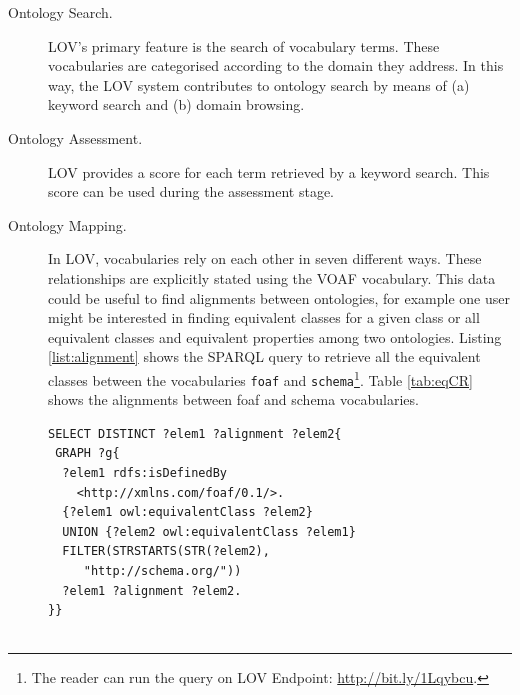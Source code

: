 \documentclass{iosart2c}
\begin{document}
\begin{description}

 \item [Ontology Search.] LOV's primary feature is the search of vocabulary terms. These vocabularies are categorised according to the domain they address. In this way, the LOV system contributes to ontology search by means of (a) keyword search and (b) domain browsing.
 \item [Ontology Assessment.] LOV provides a score for each term retrieved by a keyword search. This score can be used during the assessment stage.
 \item [Ontology Mapping.] In LOV, vocabularies rely on each other in seven different ways. These relationships are explicitly stated using the VOAF vocabulary. This data could be useful to find alignments between ontologies, for example one user might be interested in finding equivalent classes for a given class or all equivalent classes and equivalent properties among two ontologies. Listing \ref{list:alignment} shows the SPARQL query to retrieve all the equivalent classes between the vocabularies \texttt{foaf} and \texttt{schema}\footnote{The reader can run the query on LOV Endpoint: \url{http://bit.ly/1Lqybcu}.}. Table \ref{tab:eqCR} shows the alignments between foaf and schema vocabularies.
     
 \begin{lstlisting}[basicstyle=\tiny,float=htb,caption={SPARQL query asking for all the equivalent classes and properties between the vocabularies foaf and schema.},label=list:alignment, language=turtle]
SELECT DISTINCT ?elem1 ?alignment ?elem2{
 GRAPH ?g{
  ?elem1 rdfs:isDefinedBy 
    <http://xmlns.com/foaf/0.1/>.
  {?elem1 owl:equivalentClass ?elem2}
  UNION {?elem2 owl:equivalentClass ?elem1}
  FILTER(STRSTARTS(STR(?elem2), 
     "http://schema.org/"))
  ?elem1 ?alignment ?elem2.
}}
	
	\end{lstlisting}
	
 \begin{table}[h!tb]
\caption{Equivalent classes and properties between foaf and schema.org.}
\label{tab:eqCR}
\end{table}
    

\end{description}
\end{document}
